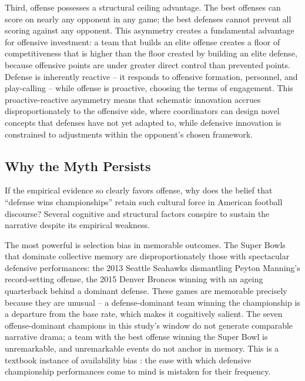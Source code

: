 Third, offense possesses a structural ceiling advantage. The best offenses can
score on nearly any opponent in any game; the best defenses cannot prevent all
scoring against any opponent. This asymmetry creates a fundamental advantage
for offensive investment: a team that builds an elite offense creates a floor
of competitiveness that is higher than the floor created by building an elite
defense, because offensive points are under greater direct control than prevented
points. Defense is inherently reactive -- it responds to offensive formation,
personnel, and play-calling -- while offense is proactive, choosing the terms of
engagement. This proactive-reactive asymmetry means that schematic innovation
accrues disproportionately to the offensive side, where coordinators can design
novel concepts that defenses have not yet adapted to, while defensive innovation
is constrained to adjustments within the opponent's chosen framework.

\subsection{Why the Myth Persists}
\label{sec:myth-persistence}

If the empirical evidence so clearly favors offense, why does the belief that
``defense wins championships'' retain such cultural force in American football
discourse? Several cognitive and structural factors conspire to sustain the
narrative despite its empirical weakness.

The most powerful is selection bias in memorable outcomes. The Super Bowls that
dominate collective memory are disproportionately those with spectacular defensive
performances: the 2013 Seattle Seahawks dismantling Peyton Manning's record-setting
offense, the 2015 Denver Broncos winning with an ageing quarterback behind a
dominant defense. These games are memorable precisely because they are unusual -- a
defense-dominant team winning the championship is a departure from the base rate,
which makes it cognitively salient. The seven offense-dominant champions in this
study's window do not generate comparable narrative drama; a team with the best
offense winning the Super Bowl is unremarkable, and unremarkable events do not
anchor in memory. This is a textbook instance of availability bias \parencite{tversky1973availability}: the ease
with which defensive championship performances come to mind is mistaken for their
frequency.

